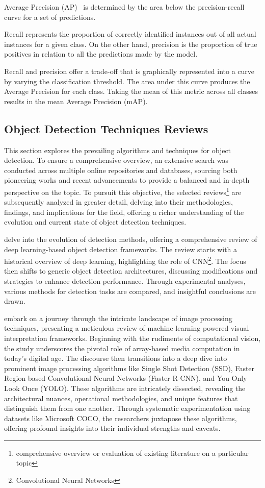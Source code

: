 Average Precision (AP)~\cite{rfc14} is determined by the area below the precision-recall curve for a set of predictions.

Recall represents the proportion of correctly identified instances out of all actual instances for a given class. On the other hand, precision is the proportion of true positives in relation to all the predictions made by the model.

Recall and precision offer a trade-off that is graphically represented into a curve by varying the classification threshold. The area under this curve produces the Average Precision for each class. Taking the mean of this metric across all classes results in the mean Average Precision (mAP).

\subsection{Object Detection Techniques Reviews}
This section explores the prevailing algorithms and techniques for object detection. To ensure a comprehensive overview, an extensive search was conducted across multiple online repositories and databases, sourcing both pioneering works and recent advancements to provide a balanced and in-depth perspective on the topic. To pursuit this objective, the selected reviews\footnote{comprehensive overview or evaluation of existing literature on a particular topic} are subsequently analyzed in greater detail, delving into their methodologies, findings, and implications for the field, offering a richer understanding of the evolution and current state of object detection techniques.

\citet{rfc2} delve into the evolution of detection methods, offering a comprehensive review of deep learning-based object detection frameworks. The review starts with a historical overview of deep learning, highlighting the role of CNN\footnote{Convolutional Neural Networks}. The focus then shifts to generic object detection architectures, discussing modifications and strategies to enhance detection performance. Through experimental analyses, various methods for detection tasks are compared, and insightful conclusions are drawn.

\citet{rfc8} embark on a journey through the intricate landscape of image processing techniques, presenting a meticulous review of machine learning-powered visual interpretation frameworks. Beginning with the rudiments of computational vision, the study underscores the pivotal role of array-based media computation in today's digital age. The discourse then transitions into a deep dive into prominent image processing algorithms like Single Shot Detection (SSD), Faster Region based Convolutional Neural Networks (Faster R-CNN), and You Only Look Once (YOLO). These algorithms are intricately dissected, revealing the architectural nuances, operational methodologies, and unique features that distinguish them from one another. Through systematic experimentation using datasets like Microsoft COCO, the researchers juxtapose these algorithms, offering profound insights into their individual strengths and caveats.

